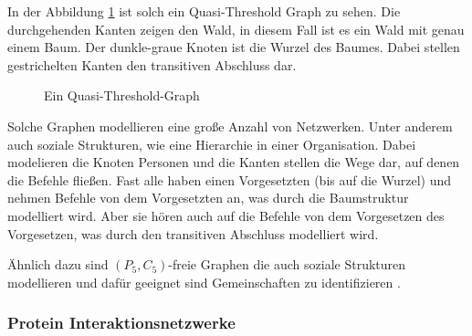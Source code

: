 \documentclass[12pt,a4paper,onecolumn,oneside,titlepage]{article}
\begin{document}
In der Abbildung \ref{fig:quasi-threhold} ist solch ein Quasi-Threshold Graph zu sehen. Die durchgehenden Kanten zeigen den Wald, in diesem Fall ist es ein Wald mit genau einem Baum. Der dunkle-graue Knoten ist die Wurzel des Baumes.  Dabei stellen gestrichelten Kanten den transitiven Abschluss dar. 
\begin{figure}
  \begin{center}
    


  \end{center}
  \caption{Ein Quasi-Threshold-Graph}
  \label{fig:quasi-threhold}
\end{figure}

Solche Graphen modellieren eine große Anzahl von Netzwerken. Unter anderem auch soziale Strukturen, wie eine Hierarchie in einer Organisation. Dabei modelieren die Knoten Personen und die Kanten stellen die Wege dar, auf denen die Befehle fließen. Fast alle haben einen Vorgesetzten (bis auf die Wurzel) und nehmen Befehle von dem Vorgesetzten an, was durch die Baumstruktur modelliert wird. Aber sie hören auch auf die Befehle von dem Vorgesetzen des Vorgesetzen, was durch den transitiven Abschluss modelliert wird\cite{NastosG13}. 

Ähnlich dazu sind $(P_5,C_5)$-freie Graphen die auch soziale Strukturen modellieren und dafür geeignet sind Gemeinschaften zu identifizieren \cite{Schoch15}. 

\subsubsection{Protein Interaktionsnetzwerke}
\end{document}
